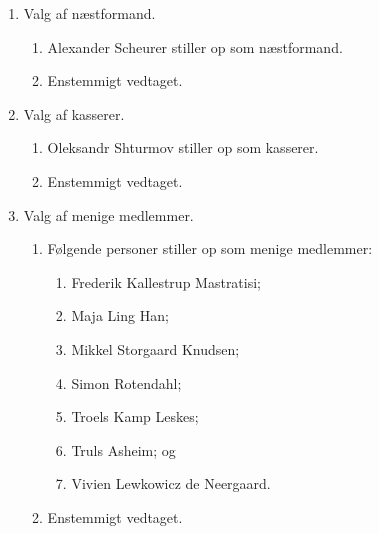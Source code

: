 \documentclass[a4paper]{article}
\begin{document}
\begin{enumerate}
\begin{enumerate}
\begin{enumerate}
\end{enumerate}

\item Valg af næstformand.

\begin{enumerate}

\item Alexander Scheurer stiller op som næstformand.

\item Enstemmigt vedtaget.

\end{enumerate}

\item Valg af kasserer.

\begin{enumerate}

\item Oleksandr Shturmov stiller op som kasserer.

\item Enstemmigt vedtaget.

\end{enumerate}

\item Valg af menige medlemmer.

\begin{enumerate}

\item Følgende personer stiller op som menige medlemmer:

\begin{enumerate}

\item Frederik Kallestrup Mastratisi;

\item Maja Ling Han;

\item Mikkel Storgaard Knudsen;

\item Simon Rotendahl;

\item Troels Kamp Leskes;

\item Truls Asheim; og

\item Vivien Lewkowicz de Neergaard.

\end{enumerate}

\item Enstemmigt vedtaget.


\end{enumerate}
\end{enumerate}
\end{enumerate}
\end{document}
